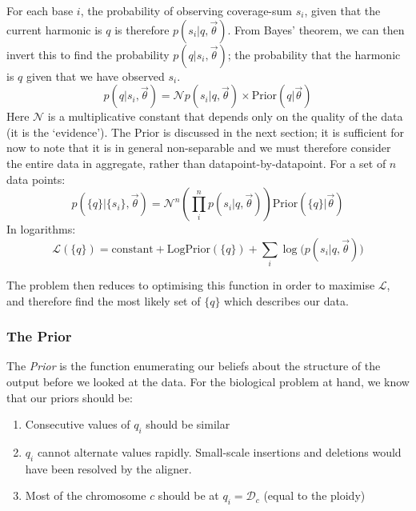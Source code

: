 \documentclass[fleqn,usenatbib]{mnras}
\begin{document}
{{						For each base $i$, the probability of observing coverage-sum $s_i$, given that the current harmonic is $q$ is therefore $p(s_i | q, \vec{\theta})$. From Bayes' theorem, we can then invert this to find the probability $p(q | s_i, \vec{\theta})$; the probability that the harmonic is $q$ given that we have observed $s_i$.
						\begin{equation}
							p(q|s_i, \vec{\theta}) = \mathcal{N} {p(s_i | q, \vec{\theta}) \times \text{Prior}(q | \vec{\theta})}
						\end{equation}
						Here $\mathcal{N}$ is a multiplicative constant that depends only on the quality of the data (it is the `evidence'). The Prior is discussed in the next section; it is sufficient for now to note that it is in general non-separable and we must therefore consider the entire data in aggregate, rather than datapoint-by-datapoint. For a set of $n$ data points:
						\begin{equation}
							p( \{q\} | \{s_i\} , \vec{\theta}) = \mathcal{N}^n\left(\prod_i^n p(s_i | q, \vec{\theta}) \right) \text{Prior}(\{q\}| \vec{\theta})
						\end{equation}
						In logarithms:
						\begin{equation}
							\mathcal{L}(\{q\}) = \text{constant} + \text{LogPrior}(\{q\}) + \sum_i \log\big( p(s_i| q, \vec{\theta})\big) 
						\end{equation}

						The problem then reduces to optimising this function in order to maximise $\mathcal{L}$, and therefore find the most likely set of $\{q\}$ which describes our data.
						
					\subsubsection{The Prior}


						The \textit{Prior} is the function enumerating our beliefs about the structure of the output before we looked at the data. For the biological problem at hand, we know that our priors should be:

						\begin{enumerate}
							\item Consecutive values of $q_i$ should be similar
							\item $q_i$ cannot alternate values rapidly. Small-scale insertions and deletions would have been resolved by the aligner. 
							\item Most of the chromosome $c$ should be at $q_i = \mathcal{D}_c$ (equal to the ploidy)
						\end{enumerate}
					

}}
\end{document}
